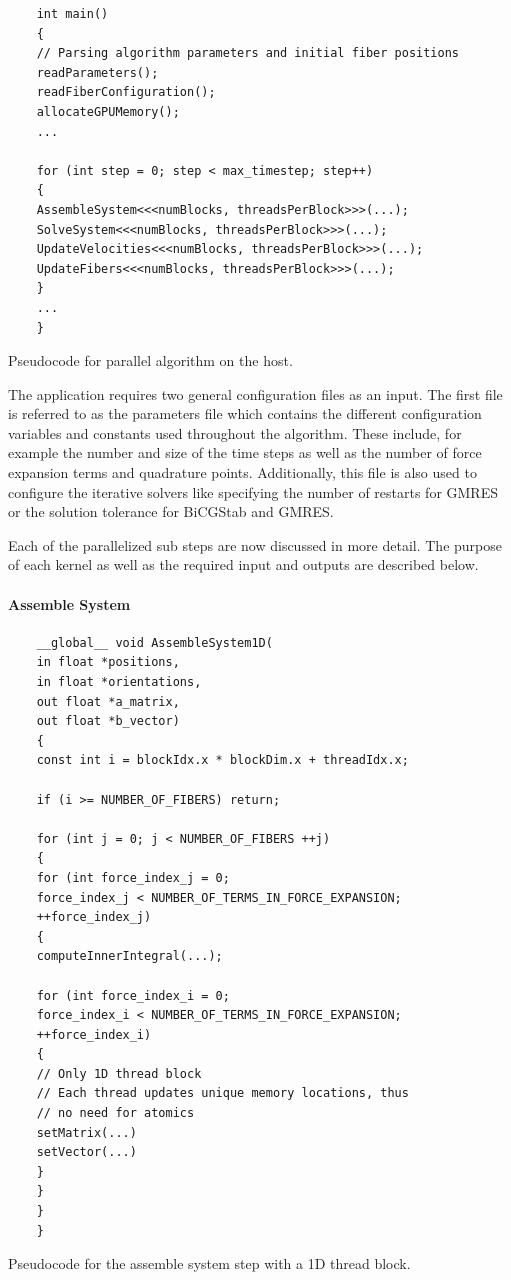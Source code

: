 \begin{listing}[!htbp]
  \centering
  \begin{verbatim}
    int main()
    {
    // Parsing algorithm parameters and initial fiber positions
    readParameters();
    readFiberConfiguration();
    allocateGPUMemory();
    ...

    for (int step = 0; step < max_timestep; step++)
    {
    AssembleSystem<<<numBlocks, threadsPerBlock>>>(...);
    SolveSystem<<<numBlocks, threadsPerBlock>>>(...);
    UpdateVelocities<<<numBlocks, threadsPerBlock>>>(...);
    UpdateFibers<<<numBlocks, threadsPerBlock>>>(...);
    }
    ...
    }
  \end{verbatim}
  \caption{Pseudocode for parallel algorithm on the host.}
  \label{lst:pseudo_parallel_algorithm}
\end{listing}

The application requires two general configuration files as an input. The first file is referred to as the parameters file which contains the different configuration variables and constants used throughout the algorithm. These include, for example the number and size of the time steps as well as the number of force expansion terms and quadrature points. Additionally, this file is also used to configure the iterative solvers like specifying the number of restarts for GMRES or the solution tolerance for BiCGStab and GMRES.

Each of the parallelized sub steps are now discussed in more detail. The purpose of each kernel as well as the required input and outputs are described below.

\paragraph{Assemble System}

\begin{listing}[!htbp]
  \centering
  \begin{verbatim}
    __global__ void AssembleSystem1D(
    in float *positions,
    in float *orientations,
    out float *a_matrix,
    out float *b_vector)
    {
    const int i = blockIdx.x * blockDim.x + threadIdx.x;

    if (i >= NUMBER_OF_FIBERS) return;

    for (int j = 0; j < NUMBER_OF_FIBERS ++j)
    {
    for (int force_index_j = 0;
    force_index_j < NUMBER_OF_TERMS_IN_FORCE_EXPANSION;
    ++force_index_j)
    {
    computeInnerIntegral(...);

    for (int force_index_i = 0;
    force_index_i < NUMBER_OF_TERMS_IN_FORCE_EXPANSION;
    ++force_index_i)
    {
    // Only 1D thread block
    // Each thread updates unique memory locations, thus
    // no need for atomics
    setMatrix(...)
    setVector(...)
    }
    }
    }
    }
  \end{verbatim}
  \caption{Pseudocode for the assemble system step with a 1D thread block.}
  \label{lst:pseudo_assemble_system}
\end{listing}

